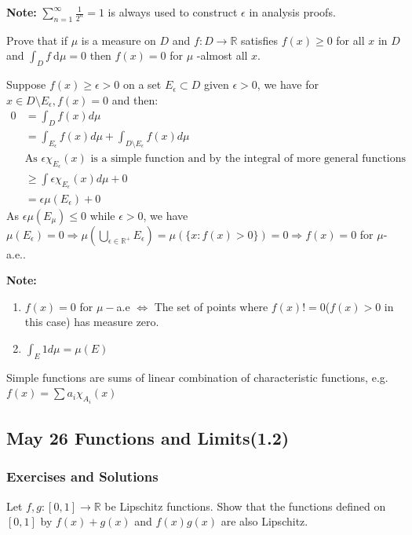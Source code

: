 \textbf{Note: }$\displaystyle \sum_{n=1}^{\infty} \frac{1}{2^n} = 1$ is always used to construct $\epsilon$ in analysis proofs.
 
\begin{customexercise}{1.24}
    Prove that if $\mu$ is a measure on $D$ and $f: D \rightarrow \mathbb{R}$ satisfies $f(x) \geq 0$ for all $x$ in $D$ and $\int_{D} f \mathrm{~d} \mu=0$ then $f(x)=0$ for $\mu$ -almost all $x$.
\end{customexercise}

\begin{customsol}{1.24}
Suppose $f(x)\geq\epsilon>0$ on a set $E_\epsilon\subset D$ given $\epsilon>0$, we have for $x\in D\setminus E_\epsilon, f(x)=0$ and then:
$$\begin{aligned}
    0 &= \int_D f(x) d\mu\\ &= \int_{E_\epsilon} f(x)d\mu + \int_{D\setminus E_\epsilon} f(x)d\mu\\
    &\text{As }\epsilon \chi_{E_\epsilon}(x) \text{ is a simple function and by the integral of more general functions}\\
    &\geq \int \epsilon \chi_{E_\epsilon}(x) d\mu + 0 \\ &= \epsilon\mu(E_\epsilon) + 0
\end{aligned}$$
As $\epsilon\mu(E_\mu)\leq 0$ while $\epsilon>0$, we have $\mu(E_\epsilon) = 0 \Rightarrow \mu\left(\bigcup_{\epsilon\in\mathbb{R}^+} E_\epsilon\right) = \mu\left(\{x: f(x)>0\}\right) = 0\Rightarrow f(x) = 0$ for $\mu$-a.e.. 
\end{customsol}

\textbf{Note: } 
\begin{enumerate}
    \item $f(x) = 0$ for $\mu-$a.e $\Leftrightarrow$ The set of points where $f(x)!=0$($f(x)>0$ in this case) has measure zero.
    \item $\displaystyle\int_E 1 d\mu = \mu(E)$
\end{enumerate}
\begin{definition}
    Simple functions are sums of linear combination of characteristic functions, e.g. $\displaystyle f(x) = \sum a_i \chi_{A_i}(x)$
\end{definition}

\newpage

\subsection{May 26 Functions and Limits(1.2)}
\subsubsection{Exercises and Solutions}
\begin{customexercise}{1.12}
    Let $f, g:[0,1] \rightarrow \mathbb{R}$ be Lipschitz functions. 
    Show that the functions defined on $[0,1]$ by $f(x)+g(x)$ and 
    $f(x) g(x)$ are also Lipschitz.
\end{customexercise}

